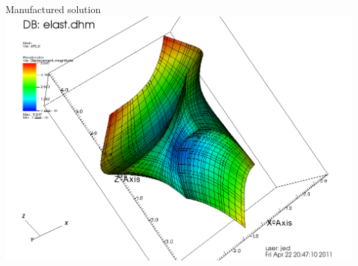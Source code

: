 \documentclass{beamer}
\begin{document}
\begin{frame}{Manufactured solution}
  \includegraphics[width=\textwidth]{figures/elast-b4q5} \\
\end{frame}
\end{document}
